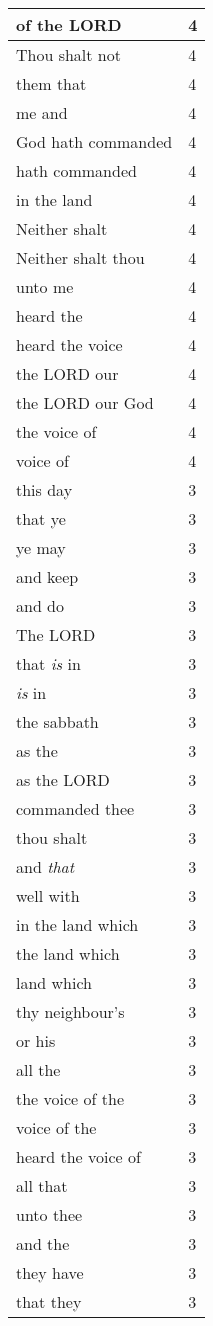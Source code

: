 \begin{center}
\begin{longtable}{|p{3.0in}|p{0.5in}|}
of the LORD & 4\\ \hline 
Thou shalt not & 4\\ \hline 
them that & 4\\ \hline 
me and & 4\\ \hline 
God hath commanded & 4\\ \hline 
hath commanded & 4\\ \hline 
in the land & 4\\ \hline 
Neither shalt & 4\\ \hline 
Neither shalt thou & 4\\ \hline 
unto me & 4\\ \hline 
heard the & 4\\ \hline 
heard the voice & 4\\ \hline 
the LORD our & 4\\ \hline 
the LORD our God & 4\\ \hline 
the voice of & 4\\ \hline 
voice of & 4\\ \hline 
this day & 3\\ \hline 
that ye & 3\\ \hline 
ye may & 3\\ \hline 
and keep & 3\\ \hline 
and do & 3\\ \hline 
The LORD & 3\\ \hline 
that \emph{is} in & 3\\ \hline 
\emph{is} in & 3\\ \hline 
the sabbath & 3\\ \hline 
as the & 3\\ \hline 
as the LORD & 3\\ \hline 
commanded thee & 3\\ \hline 
thou shalt & 3\\ \hline 
and \emph{that} & 3\\ \hline 
well with & 3\\ \hline 
in the land which & 3\\ \hline 
the land which & 3\\ \hline 
land which & 3\\ \hline 
thy neighbour's & 3\\ \hline 
or his & 3\\ \hline 
all the & 3\\ \hline 
the voice of the & 3\\ \hline 
voice of the & 3\\ \hline 
heard the voice of & 3\\ \hline 
all that & 3\\ \hline 
unto thee & 3\\ \hline 
and the & 3\\ \hline 
they have & 3\\ \hline 
that they & 3\\ \hline 
\end{longtable}
\end{center}





